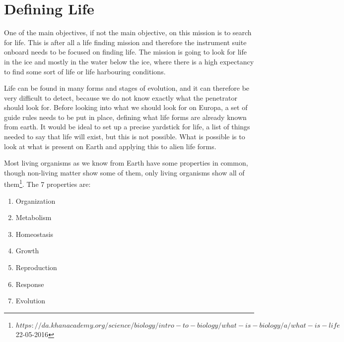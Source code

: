 \chapter{Defining Life}

One of the main objectives, if not the main objective, on this mission is to search for life. This is after all a life finding mission and therefore the instrument suite onboard needs to be focused on finding life. The mission is going to look for life in the ice and mostly in the water below the ice, where there is a high expectancy to find some sort of life or life harbouring conditions. \par
Life can be found in many forms and stages of evolution, and it can therefore be very difficult to detect, because we do not know exactly what the penetrator should look for. Before looking into what we should look for on Europa, a set of guide rules needs to be put in place, defining what life forms are already known from earth. It would be ideal to set up a precise yardstick for life, a list of things needed to say that life will exist, but this is not possible. What is possible is to look at what is present on Earth and applying this to alien life forms. \par
Most living organisms as we know from Earth have some properties in common, though non-living matter show some of them, only living organisms show all of them\footnote{$https://da.khanacademy.org/science/biology/intro-to-biology/what-is-biology/a/what-is-life$ 22-05-2016}. The 7 properties are: \par

\begin{enumerate}
  \item Organization
  \item Metabolism
  \item Homeostasis
  \item Growth
  \item Reproduction
  \item Response
  \item Evolution
\end{enumerate}


